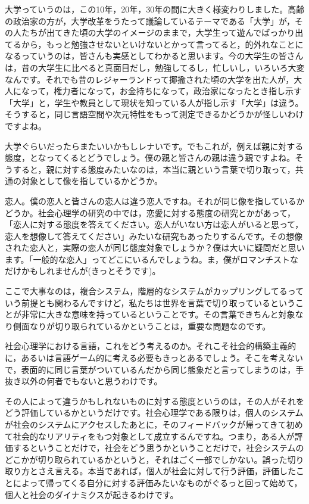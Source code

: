 \documentclass{ltjsbook}
\begin{document}
大学っていうのは，この10年，20年，30年の間に大きく様変わりしました。高齢の政治家の方が，大学改革をうたって議論しているテーマである「大学」が，その人たちが出てきた頃の大学のイメージのままで，大学生って遊んでばっかり出てるから，もっと勉強させないといけないとかって言ってると，的外れなことになるっていうのは，皆さんも実感としてわかると思います。今の大学生の皆さんは，昔の大学生に比べると真面目だし，勉強してるし，忙しいし，いろいろ大変なんです。それでも昔のレジャーランドって揶揄された頃の大学を出た人が，大人になって，権力者になって，お金持ちになって，政治家になったとき指し示す「大学」と，学生や教員として現状を知っている人が指し示す「大学」は違う。そうすると，同じ言語空間や次元特性をもって測定できるかどうかが怪しいわけですよね。

大学ぐらいだったらまたいいかもしレナいです。でもこれが，例えば親に対する態度，となってくるとどうでしょう。僕の親と皆さんの親は違う親ですよね。そうすると，親に対する態度みたいなのは，本当に親という言葉で切り取って，共通の対象として像を指しているかどうか。

恋人。僕の恋人と皆さんの恋人は違う恋人ですね。それが同じ像を指しているかどうか。社会心理学の研究の中では，恋愛に対する態度の研究とかがあって，「恋人に対する態度を答えてください。恋人がいない方は恋人がいると思って，恋人を想像して答えてください」みたいな研究もあったりするんです。その想像された恋人と，実際の恋人が同じ態度対象でしょうか？僕は大いに疑問だと思います。「一般的な恋人」ってどこにいるんでしょうね。ま，僕がロマンチストなだけかもしれませんが(きっとそうです)。

ここで大事なのは，複合システム，階層的なシステムがカップリングしてるっていう前提とも関わるんですけど，私たちは世界を言葉で切り取っているということが非常に大きな意味を持っているということです。その言葉できちんと対象なり側面なりが切り取られているかということは，重要な問題なのです。

社会心理学における言語，これをどう考えるのか。それこそ社会的構築主義的に，あるいは言語ゲーム的に考える必要もきっとあるでしょう。そこを考えないで，表面的に同じ言葉がついているんだから同じ態象だと言ってしまうのは，手抜き以外の何者でもないと思うわけです。

その人によって違うかもしれないものに対する態度というのは，その人がそれをどう評価しているかというだけです。社会心理学である限りは，個人のシステムが社会のシステムにアクセスしたあとに，そのフィードバックが帰ってきて初めて社会的なリアリティをもつ対象として成立するんですね。つまり，ある人が評価するということだけで，社会をどう思うかということだけで，社会システムのどこかが切り取られているかというと，それはごく一部でしかない。誤った切り取り方とさえ言える。本当であれば，個人が社会に対して行う評価，評価したことによって帰ってくる自分に対する評価みたいなものがぐるっと回って始めて，個人と社会のダイナミクスが起きるわけです。
\end{document}
